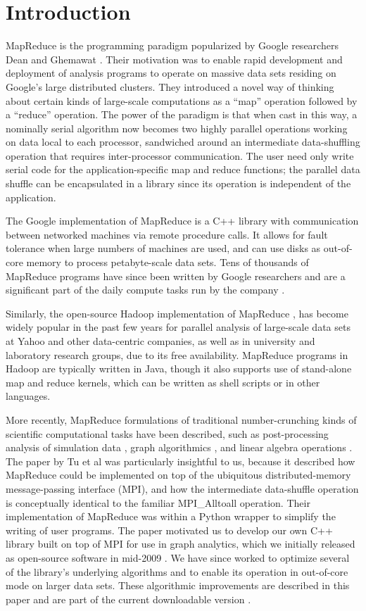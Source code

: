 \section{Introduction}
\label{sec:intro}

MapReduce is the programming paradigm popularized by Google
researchers Dean and Ghemawat \cite{Dean}.  Their motivation was to
enable rapid development and deployment of analysis programs to
operate on massive data sets residing on Google's large distributed
clusters.  They introduced a novel way of thinking about certain kinds
of large-scale computations as a ``map'' operation followed by a
``reduce'' operation.  The power of the paradigm is that when cast in
this way, a nominally serial algorithm now becomes two highly parallel
operations working on data local to each processor, sandwiched around
an intermediate data-shuffling operation that requires inter-processor
communication.  The user need only write serial code for the
application-specific map and reduce functions; the parallel data
shuffle can be encapsulated in a library since its operation is
independent of the application.

The Google implementation of MapReduce is a C++ library with
communication between networked machines via remote procedure calls.
It allows for fault tolerance when large numbers of machines are used,
and can use disks as out-of-core memory to process petabyte-scale data
sets.  Tens of thousands of MapReduce programs have since been written
by Google researchers and are a significant part of the daily compute
tasks run by the company \cite{Dean2}.

Similarly, the open-source Hadoop implementation of MapReduce
\cite{Hadoop}, has become widely popular in the past few years for
parallel analysis of large-scale data sets at Yahoo and other
data-centric companies, as well as in university and laboratory
research groups, due to its free availability.  MapReduce programs in
Hadoop are typically written in Java, though it also supports use of
stand-alone map and reduce kernels, which can be written as shell
scripts or in other languages.

More recently, MapReduce formulations of traditional number-crunching
kinds of scientific computational tasks have been described, such as
post-processing analysis of simulation data \cite{Tu}, graph
algorithmics \cite{Cohen}, and linear algebra operations \cite{Fox}.
The paper by Tu et al \cite{Tu} was particularly insightful to us,
because it described how MapReduce could be implemented on top of the
ubiquitous distributed-memory message-passing interface (MPI), and how
the intermediate data-shuffle operation is conceptually identical to
the familiar MPI\_Alltoall operation.  Their implementation of
MapReduce was within a Python wrapper to simplify the writing of user
programs.  The paper motivated us to develop our own C++ library built
on top of MPI for use in graph analytics, which we initially released
as open-source software in mid-2009 \cite{MRMPI}.  We have since
worked to optimize several of the library's underlying algorithms and
to enable its operation in out-of-core mode on larger data sets.
These algorithmic improvements are described in this paper and are
part of the current downloadable version \cite{MRMPI}.

